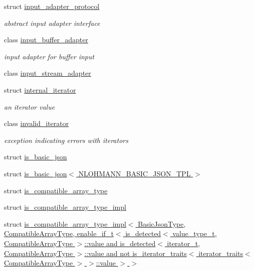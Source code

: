 \begin{DoxyCompactItemize}
struct \hyperlink{structnlohmann_1_1detail_1_1input__adapter__protocol}{input\+\_\+adapter\+\_\+protocol}
\begin{DoxyCompactList}\small\item\em abstract input adapter interface \end{DoxyCompactList}\item 
class \hyperlink{classnlohmann_1_1detail_1_1input__buffer__adapter}{input\+\_\+buffer\+\_\+adapter}
\begin{DoxyCompactList}\small\item\em input adapter for buffer input \end{DoxyCompactList}\item 
class \hyperlink{classnlohmann_1_1detail_1_1input__stream__adapter}{input\+\_\+stream\+\_\+adapter}
\item 
struct \hyperlink{structnlohmann_1_1detail_1_1internal__iterator}{internal\+\_\+iterator}
\begin{DoxyCompactList}\small\item\em an iterator value \end{DoxyCompactList}\item 
class \hyperlink{classnlohmann_1_1detail_1_1invalid__iterator}{invalid\+\_\+iterator}
\begin{DoxyCompactList}\small\item\em exception indicating errors with iterators \end{DoxyCompactList}\item 
struct \hyperlink{structnlohmann_1_1detail_1_1is__basic__json}{is\+\_\+basic\+\_\+json}
\item 
struct \hyperlink{structnlohmann_1_1detail_1_1is__basic__json_3_01_n_l_o_h_m_a_n_n___b_a_s_i_c___j_s_o_n___t_p_l_01_4}{is\+\_\+basic\+\_\+json$<$ N\+L\+O\+H\+M\+A\+N\+N\+\_\+\+B\+A\+S\+I\+C\+\_\+\+J\+S\+O\+N\+\_\+\+T\+P\+L $>$}
\item 
struct \hyperlink{structnlohmann_1_1detail_1_1is__compatible__array__type}{is\+\_\+compatible\+\_\+array\+\_\+type}
\item 
struct \hyperlink{structnlohmann_1_1detail_1_1is__compatible__array__type__impl}{is\+\_\+compatible\+\_\+array\+\_\+type\+\_\+impl}
\item 
struct \hyperlink{structnlohmann_1_1detail_1_1is__compatible__array__type__impl_3_01_basic_json_type_00_01_compati04c4671a9fa75002365be1949a74f972}{is\+\_\+compatible\+\_\+array\+\_\+type\+\_\+impl$<$ Basic\+Json\+Type, Compatible\+Array\+Type, enable\+\_\+if\+\_\+t$<$ is\+\_\+detected$<$ value\+\_\+type\+\_\+t, Compatible\+Array\+Type $>$\+::value and is\+\_\+detected$<$ iterator\+\_\+t, Compatible\+Array\+Type $>$\+::value and not is\+\_\+iterator\+\_\+traits$<$ iterator\+\_\+traits$<$ Compatible\+Array\+Type $>$ $>$\+::value $>$ $>$}

\end{DoxyCompactItemize}
